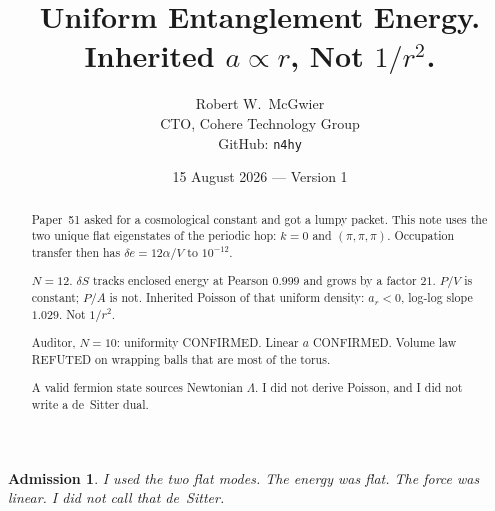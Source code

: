 \documentclass[11pt]{article}
\title{\textbf{Uniform Entanglement Energy.\\
Inherited $a\propto r$, Not $1/r^2$.}}
\author{Robert W.\ McGwier\\
\small CTO, Cohere Technology Group\\
\small GitHub: \texttt{n4hy}}
\date{15 August 2026 --- Version 1}
\newtheorem*{admission}{Admission}
\begin{document}
\maketitle

\begin{abstract}
\noindent
Paper~51 asked for a cosmological constant and got a
lumpy packet. This note uses the two unique flat
eigenstates of the periodic hop: $k=0$ and
$(\pi,\pi,\pi)$. Occupation transfer then has
$\delta e=12\alpha/V$ to $10^{-12}$.

$N=12$. $\delta S$ tracks enclosed energy at Pearson
$0.999$ and grows by a factor $21$. $P/V$ is constant;
$P/A$ is not. Inherited Poisson of that uniform density:
$a_r<0$, log-log slope $1.029$. Not $1/r^2$.

Auditor, $N=10$: uniformity CONFIRMED. Linear $a$
CONFIRMED. Volume law REFUTED on wrapping balls that
are most of the torus.

A valid fermion state sources Newtonian $\Lambda$.
I did not derive Poisson, and I did not write a
de~Sitter dual.
\end{abstract}

\begin{admission}
I used the two flat modes. The energy was flat. The
force was linear. I did not call that de~Sitter.
\end{admission}
\end{document}
